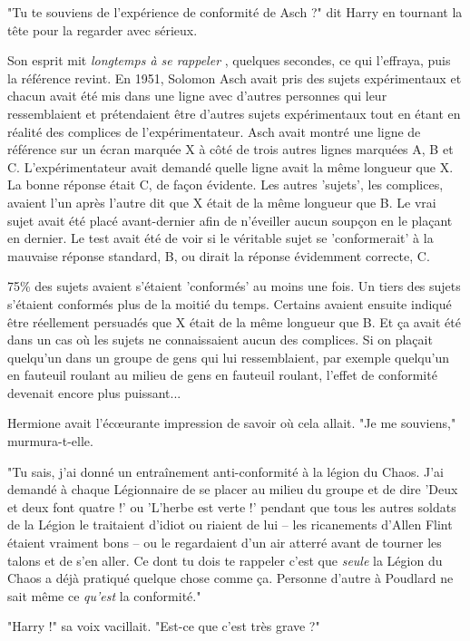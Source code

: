 "Tu te souviens de l'expérience de conformité de Asch ?" dit Harry en tournant la tête pour la regarder avec sérieux.

Son esprit mit \emph{longtemps à se rappeler} , quelques secondes, ce qui l'effraya, puis la référence revint. En 1951, Solomon Asch avait pris des sujets expérimentaux et chacun avait été mis dans une ligne avec d'autres personnes qui leur ressemblaient et prétendaient être d'autres sujets expérimentaux tout en étant en réalité des complices de l'expérimentateur. Asch avait montré une ligne de référence sur un écran marquée X à côté de trois autres lignes marquées A, B et C. L'expérimentateur avait demandé quelle ligne avait la même longueur que X. La bonne réponse était C, de façon évidente. Les autres 'sujets', les complices, avaient l'un après l'autre dit que X était de la même longueur que B. Le vrai sujet avait été placé avant-dernier afin de n'éveiller aucun soupçon en le plaçant en dernier. Le test avait été de voir si le véritable sujet se 'conformerait' à la mauvaise réponse standard, B, ou dirait la réponse évidemment correcte, C.

75\% des sujets avaient s'étaient 'conformés' au moins une fois. Un tiers des sujets s'étaient conformés plus de la moitié du temps. Certains avaient ensuite indiqué être réellement persuadés que X était de la même longueur que B. Et ça avait été dans un cas où les sujets ne connaissaient aucun des complices. Si on plaçait quelqu'un dans un groupe de gens qui lui ressemblaient, par exemple quelqu'un en fauteuil roulant au milieu de gens en fauteuil roulant, l'effet de conformité devenait encore plus puissant...

Hermione avait l'écœurante impression de savoir où cela allait. "Je me souviens," murmura-t-elle.

"Tu sais, j'ai donné un entraînement anti-conformité à la légion du Chaos. J'ai demandé à chaque Légionnaire de se placer au milieu du groupe et de dire 'Deux et deux font quatre !' ou 'L'herbe est verte !' pendant que tous les autres soldats de la Légion le traitaient d'idiot ou riaient de lui – les ricanements d'Allen Flint étaient vraiment bons – ou le regardaient d'un air atterré avant de tourner les talons et de s'en aller. Ce dont tu dois te rappeler c'est que \emph{seule}  la Légion du Chaos a déjà pratiqué quelque chose comme ça. Personne d'autre à Poudlard ne sait même ce \emph{qu'est}  la conformité."

"Harry !" sa voix vacillait. "Est-ce que c'est très grave ?"

